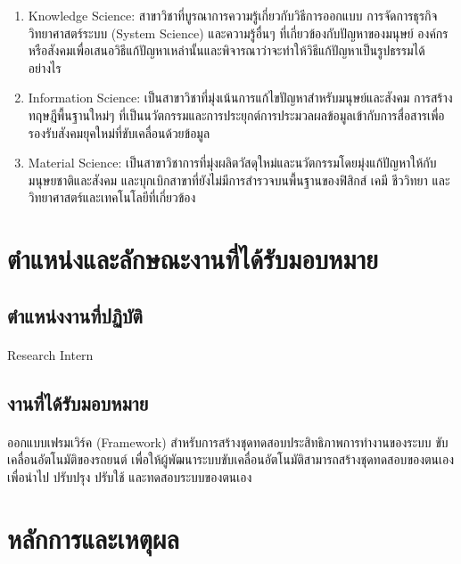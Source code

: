 \begin{enumerate}[label=\arabic*.)]
    \item Knowledge Science: สาขาวิชาที่บูรณาการความรู้เกี่ยวกับวิธีการออกแบบ
การจัดการธุรกิจ วิทยาศาสตร์ระบบ (System Science)
และความรู้อื่นๆ ที่เกี่ยวข้องกับปัญหาของมนุษย์ องค์กร
หรือสังคมเพื่อเสนอวิธีแก้ปัญหาเหล่านั้นและพิจารณาว่าจะทำให้วิธีแก้ปัญหาเป็นรูปธรรมได้อย่างไร
    \item Information Science: เป็นสาขาวิชาที่มุ่งเน้นการแก้ไขปัญหาสำหรับมนุษย์และสังคม
การสร้างทฤษฎีพื้นฐานใหม่ๆ ที่เป็นนวัตกรรมและการประยุกต์การประมวลผลข้อมูลเข้ากับการสื่อสารเพื่อรองรับสังคมยุคใหม่ที่ขับเคลื่อนด้วยข้อมูล
    \item Material Science: เป็นสาขาวิชาการที่มุ่งผลิตวัสดุใหม่และนวัตกรรมโดยมุ่งแก้ปัญหาให้กับมนุษยชาติและสังคม
และบุกเบิกสาขาที่ยังไม่มีการสำรวจบนพื้นฐานของฟิสิกส์ เคมี ชีววิทยา
และวิทยาศาสตร์และเทคโนโลยีที่เกี่ยวข้อง
\end{enumerate}

\section{ตำแหน่งและลักษณะงานที่ได้รับมอบหมาย}\label{sec:job-details}

\subsection{ตำแหน่งงานที่ปฏิบัติ}\label{subsec:job-position}
\paragraph{}Research Intern
\subsection{งานที่ได้รับมอบหมาย}\label{subsec:assigned-tasks}

\paragraph{}ออกแบบเฟรมเวิร์ค
(Framework)
สำหรับการสร้างชุดทดสอบประสิทธิภาพการทำงานของระบบ
ขับเคลื่อนอัตโนมัติของรถยนต์
เพื่อให้ผู้พัฒนาระบบขับเคลื่อนอัตโนมัติสามารถสร้างชุดทดสอบของตนเอง เพื่อนำไป
ปรับปรุง ปรับใช้ และทดสอบระบบของตนเอง

\section{หลักการและเหตุผล}\label{sec:introduction}


